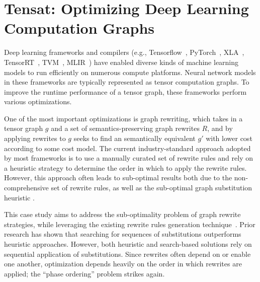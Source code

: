 \section{Tensat: Optimizing Deep Learning Computation Graphs}
\label{sec:tensat}

\newcommand{\ourname}{Tensat\xspace}
\newcommand{\tensat}{Tensat\xspace}

Deep learning frameworks and compilers
 (e.g., Tensorflow~\cite{TensorFlow}, PyTorch~\cite{NEURIPS2019_9015},
  XLA~\cite{xla}, TensorRT~\cite{TensorRT}, TVM~\cite{tvm},
  MLIR~\cite{mlir})
 have enabled diverse kinds of machine learning models to run
 efficiently on numerous compute platforms.
Neural network models in
 these frameworks are typically represented as tensor computation
 graphs.
To improve the runtime performance of a tensor graph, these
 frameworks perform various optimizations.

One of the most important optimizations is graph rewriting,
 which takes in a tensor graph $g$ and a set of semantics-preserving graph rewrites $R$,
 and by applying rewrites to $g$ seeks to find an semantically equivalent $g'$ with lower cost according to some cost model.
The current industry-standard approach adopted by most frameworks is to use a manually curated set of rewrite rules and rely on a heuristic strategy to determine the order in which to apply the rewrite rules.
However, this approach often leads to sub-optimal results both due to the non-comprehensive set of rewrite rules, as well as the sub-optimal graph substitution heuristic \cite{taso,metaflow}. %

This case study aims to address the sub-optimality problem of graph rewrite strategies, while leveraging the existing rewrite rules generation technique~\cite{taso}.
Prior research has shown that searching for sequences of substitutions
\cite{taso,metaflow,Fang:sampling} outperforms heuristic approaches.
However, both heuristic and search-based solutions rely on sequential application of substitutions.
Since rewrites often depend on or enable one another,
optimization depends heavily on the order in which rewrites are applied;
the ``phase ordering'' problem strikes again.


